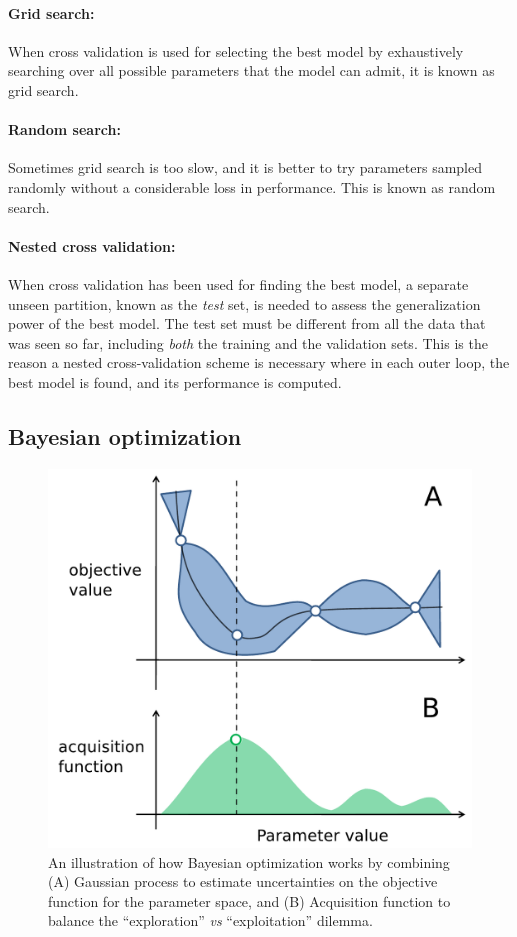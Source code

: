 \paragraph{Grid search: } When cross validation is used for selecting the best model by exhaustively searching over all possible parameters that the model can admit, it is known as grid search.

\paragraph{Random search: } Sometimes grid search is too slow, and it is better to try parameters sampled randomly without a considerable loss in performance. This is known as random search.

\paragraph{Nested cross validation: } When cross validation has been used for finding the best model, a separate unseen partition, known as the \emph{test} set, is needed to assess the generalization power of the best model. The test set must be different from all the data that was seen so far, including \emph{both} the training and the validation sets. This is the reason a nested cross-validation scheme is necessary where in each outer loop, the best model is found, and its performance is computed.

\subsection{Bayesian optimization}


\begin{figure}[htb]
\begin{center}
   \includegraphics[width=0.7\linewidth]{figures/bayes_opt.pdf}
\end{center}
   \caption[Bayesian optimization for parameter tuning]{An illustration of how Bayesian optimization works by combining (A) Gaussian process to estimate uncertainties on the objective function for the parameter space, and (B) Acquisition function to balance the ``exploration'' \emph{vs} ``exploitation'' dilemma.}
   \label{fig:bayes_opt}
\end{figure}

